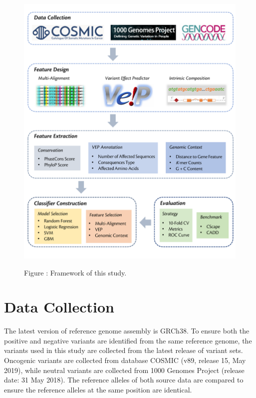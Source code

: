 \documentclass[a4paper,nohyper,nobib,openany,justified]{tufte-book}
\begin{document}
\begin{fullwidth}
\begin{figure}[p]
  \includegraphics[width=\linewidth]{Framework.pdf}%

  \smallskip\noindent\small Figure \thefigure:
Framework of this study. %
  \label{fig:framework}%
\end{figure}

\clearpage
\chapter{Data Collection}

The latest version of reference genome assembly is GRCh38. To ensure both the positive and negative variants are identified from the same reference genome, the variants used in this study are collected from the latest release of variant sets. Oncogenic variants are collected from database COSMIC (v89, release 15, May 2019), while neutral variants are collected from 1000 Genomes Project (release date: 31 May 2018). The reference alleles of both source data are compared to ensure the reference alleles at the same position are identical.


\end{fullwidth}
\end{document}
